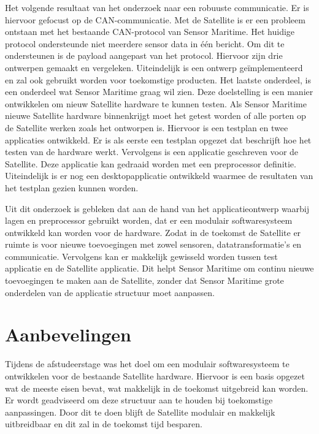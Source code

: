 \noindent Het volgende resultaat van het onderzoek naar een robuuste communicatie. Er is hiervoor gefocust op de CAN-communicatie. Met de Satellite is er een probleem ontstaan met het bestaande CAN-protocol van Sensor Maritime. Het huidige protocol ondersteunde niet meerdere sensor data in één bericht. Om dit te ondersteunen is de payload aangepast van het protocol. Hiervoor zijn drie ontwerpen gemaakt en vergeleken. Uiteindelijk is een ontwerp geïmplementeerd en zal ook gebruikt worden voor toekomstige producten. Het laatste onderdeel, is een onderdeel wat Sensor Maritime graag wil zien. Deze doelstelling is een manier ontwikkelen om nieuw Satellite hardware te kunnen testen. Als Sensor Maritime nieuwe Satellite hardware binnenkrijgt moet het getest worden of alle porten op de Satellite werken zoals het ontworpen is. Hiervoor is een testplan en twee applicaties ontwikkeld. Er is als eerste een testplan opgezet dat beschrijft hoe het testen van de hardware werkt. Vervolgens is een applicatie geschreven voor de Satellite. Deze applicatie kan gedraaid worden met een preprocessor definitie. Uiteindelijk is er nog een desktopapplicatie ontwikkeld waarmee de resultaten van het testplan gezien kunnen worden. \newline

\noindent  Uit dit onderzoek is gebleken dat aan de hand van het applicatieontwerp waarbij lagen en preprocessor gebruikt worden, dat er een modulair softwaresysteem ontwikkeld kan worden voor de hardware. Zodat in de toekomst de Satellite er ruimte is voor nieuwe toevoegingen met zowel sensoren, datatransformatie's en communicatie. Vervolgens kan er makkelijk gewisseld worden tussen test applicatie en de Satellite applicatie. Dit helpt Sensor Maritime om continu nieuwe toevoegingen te maken aan de Satellite, zonder dat Sensor Maritime grote onderdelen van de applicatie structuur moet aanpassen.




\newpage
\section{Aanbevelingen}
Tijdens de afstudeerstage was het doel om een modulair softwaresysteem te ontwikkelen voor de bestaande Satellite hardware. Hiervoor is een basis opgezet wat de meeste eisen bevat, wat makkelijk in de toekomst uitgebreid kan worden. Er wordt geadviseerd om deze structuur aan te houden bij toekomstige aanpassingen. Door dit te doen blijft de Satellite modulair en makkelijk uitbreidbaar en dit zal in de toekomst tijd besparen. \newline 


